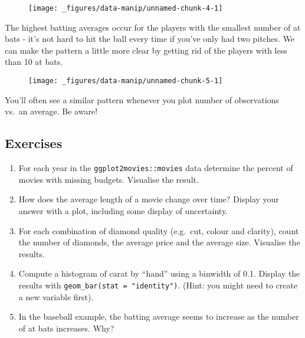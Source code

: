\begin{figure}[H]
  \centering
  \texttt{[image: \_figures/data-manip/unnamed-chunk-4-1]}
\end{figure}

The highest batting averages occur for the players with the smallest
number of at bats - it's not hard to hit the ball every time if you've
only had two pitches. We can make the pattern a little more clear by
getting rid of the players with less than 10 at bats.

\begin{Shaded}
\begin{Highlighting}[]
\NormalTok{(}\StringTok{ }\NormalTok{), }\StringTok{ }
\StringTok{  }\NormalTok{() +}\StringTok{ }
\StringTok{  }\NormalTok{()}
\end{Highlighting}
\end{Shaded}

\begin{figure}[H]
  \centering
  \texttt{[image: \_figures/data-manip/unnamed-chunk-5-1]}
\end{figure}

You'll often see a similar pattern whenever you plot number of
observations vs.~an average. Be aware!

\subsection{Exercises}

\begin{enumerate}
\def\labelenumi{\arabic{enumi}.}
\item
  For each year in the \texttt{ggplot2movies::movies} data determine the
  percent of movies with missing budgets. Visualise the result.
\item
  How does the average length of a movie change over time? Display your
  answer with a plot, including some display of uncertainty.
\item
  For each combination of diamond quality (e.g.~cut, colour and
  clarity), count the number of diamonds, the average price and the
  average size. Visualise the results.
\item
  Compute a histogram of carat by ``hand'' using a binwidth of 0.1.
  Display the results with \texttt{geom\_bar(stat\ =\ "identity")}.
  (Hint: you might need to create a new variable first).
\item
  In the baseball example, the batting average seems to increase as the
  number of at bats increases. Why?
\end{enumerate}

